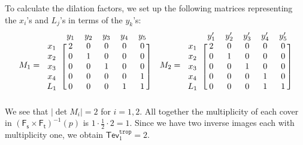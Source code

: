 \documentclass[11pt,reqno]{amsart}
\theoremstyle{definition}
\newcommand\trop{{\mathtt{trop}}}
\newcommand{\Ft}{\mathsf{F_t}}
\newcommand{\Fs}{\mathsf{F_s}}
\newcommand{\Tev}{{\mathsf{Tev}}}
\begin{document}
 To calculate the dilation factors, we set up the following matrices representing the $x_i$'s and $L_j$'s in terms of the $y_k$'s:
\[\begin{array}{cc}
  M_1=\begin{blockarray}{cccccc}
   &y_1 & y_2 & y_3 & y_4 & y_5\\
    \begin{block}{c[ccccc]}
      x_1 & 2 & 0 & 0 & 0 & 0\\
      x_2 & 0 & 1 & 0 & 0 & 0\\
      x_3 & 0 & 0 & 1 & 0 & 0\\
      x_4 & 0 & 0 & 0 & 0 & 1\\
      L_1 & 0 & 0 & 0 & 1 & 1\\
    \end{block}
  \end{blockarray} &
 M_2=\begin{blockarray}{cccccc}
   &y'_1 & y'_2 & y'_3 & y'_4 & y'_5\\
    \begin{block}{c[ccccc]}
      x_1 & 2 & 0 & 0 & 0 & 0\\
      x_2 & 0 & 1 & 0 & 0 & 0\\
      x_3 & 0 & 0 & 1 & 0 & 0\\
      x_4 & 0 & 0 & 0 & 1 & 0\\
      L_1 & 0 & 0 & 0 & 1 & 1\\
    \end{block}
  \end{blockarray}
  \end{array}
\]
We see that $|\det M_i |=2$ for $i = 1,2$.
All together the multiplicity of each cover in $(\Fs\times\Ft)^{-1}(p)$ is $1\cdot \frac{1}{2}\cdot 2=1$. Since we have two inverse images each with multiplicity one,  we obtain $\Tev^\trop_1 = 2$.


\end{document}
